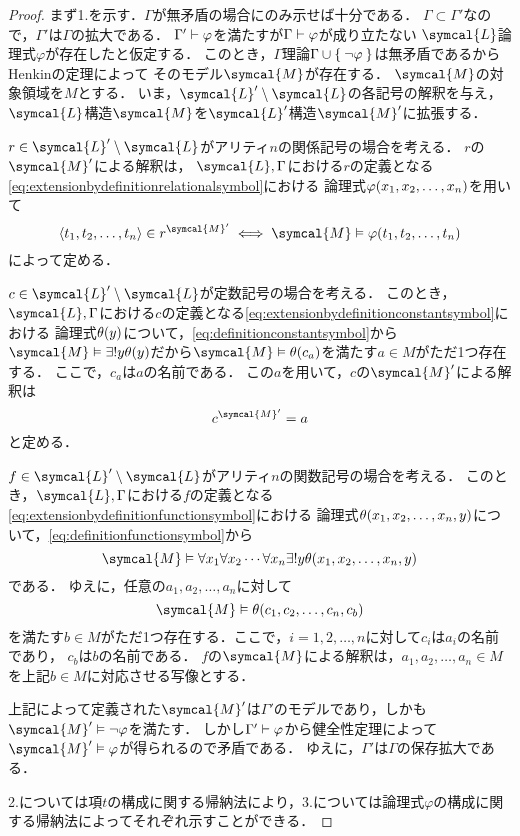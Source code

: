 \begin{proof}
	まず1.を示す．\(\Gamma\)が無矛盾の場合にのみ示せば十分である．
	\(\Gamma \subset \Gamma'\)なので，\(\Gamma'\)は\(\Gamma\)の拡大である．
	\(\Gamma' \vdash \varphi\)を満たすが\(\Gamma \vdash \varphi\)が成り立たない
	\(\symcal{L}\)論理式\(\varphi\)が存在したと仮定する．
	このとき，\(\Gamma\)理論\(\Gamma \cup \Set{\lnot \varphi}\)は無矛盾であるからHenkinの定理によって
	そのモデル\(\symcal{M}\)が存在する．
	\(\symcal{M}\)の対象領域を\(M\)とする．
	いま，\(\symcal{L}' \setminus \symcal{L}\)の各記号の解釈を与え，
	\(\symcal{L}\)構造\(\symcal{M}\)を\(\symcal{L}'\)構造\(\symcal{M}'\)に拡張する．

	\(r \in \symcal{L}' \setminus \symcal{L}\)がアリティ\(n\)の関係記号の場合を考える．
	\(r\)の\(\symcal{M}'\)による解釈は，
	\(\symcal{L}, \Gamma\)における\(r\)の定義となる\cref{eq:extensionbydefinitionrelationalsymbol}における
	論理式\(\apply{\varphi}{x_1, x_2, \dots, x_n}\)を用いて
	\[
		\pair{t_1, t_2, \dots, t_n} \in \interpretation{\symcal{M}'}{r} \metaequivalent \symcal{M} \satisfy \apply{\varphi}{t_1, t_2, \dots, t_n}
	\]
	によって定める．

	\(c \in \symcal{L}' \setminus \symcal{L}\)が定数記号の場合を考える．
	このとき，\(\symcal{L}, \Gamma\)における\(c\)の定義となる\cref{eq:extensionbydefinitionconstantsymbol}における
	論理式\(\apply{\theta}{y}\)について，\cref{eq:definitionconstantsymbol}から
	\(\symcal{M} \satisfy \uexists y \apply{\theta}{y}\)だから\(\symcal{M} \satisfy \apply{\theta}{c_a}\)を満たす\(a \in M\)がただ1つ存在する．
	ここで，\(c_a\)は\(a\)の名前である．
	この\(a\)を用いて，\(c\)の\(\symcal{M}'\)による解釈は
	\[
		\interpretation{\symcal{M}'}{c} = a
	\]
	と定める．

	\(f \in \symcal{L}' \setminus \symcal{L}\)がアリティ\(n\)の関数記号の場合を考える．
	このとき，\(\symcal{L}, \Gamma\)における\(f\)の定義となる\cref{eq:extensionbydefinitionfunctionsymbol}における
	論理式\(\apply{\theta}{x_1, x_2, \dots, x_n, y}\)について，\cref{eq:definitionfunctionsymbol}から
	\[
		\symcal{M} \satisfy \forall x_1 \forall x_2 \dotsb \forall x_n \uexists y \apply{\theta}{x_1, x_2, \dots, x_n, y}
	\]
	である．
	ゆえに，任意の\(a_1, a_2, \dots, a_n\)に対して
	\[
		\symcal{M} \satisfy \apply{\theta}{c_1, c_2, \dots, c_n, c_b}
	\]
	を満たす\(b \in M\)がただ1つ存在する．ここで，\(i = 1, 2, \dots, n\)に対して\(c_i\)は\(a_i\)の名前であり，
	\(c_b\)は\(b\)の名前である．
	\(f\)の\(\symcal{M}\)による解釈は，\(a_1, a_2, \dots, a_n \in M\)を上記\(b \in M\)に対応させる写像とする．

	上記によって定義された\(\symcal{M}'\)は\(\Gamma'\)のモデルであり，しかも\(\symcal{M}' \satisfy \lnot \varphi\)を満たす．
	しかし\(\Gamma' \vdash \varphi\)から健全性定理によって\(\symcal{M}' \satisfy \varphi\)が得られるので矛盾である．
	ゆえに，\(\Gamma'\)は\(\Gamma\)の保存拡大である．

	2.については項\(t\)の構成に関する帰納法により，3.については論理式\(\varphi\)の構成に関する帰納法によってそれぞれ示すことができる．
\end{proof}

